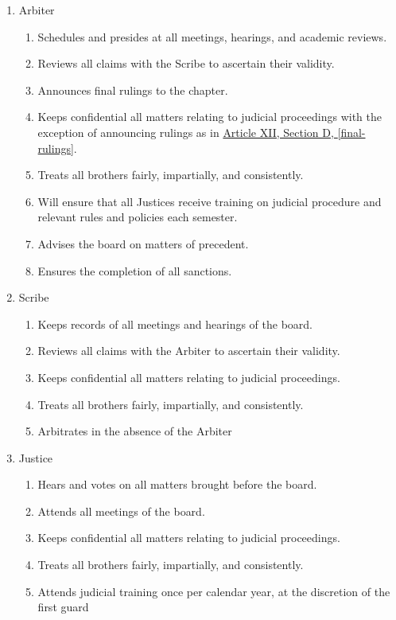 	\begin{enumerate}

		\item Arbiter
			\begin{enumerate}
				\item Schedules and presides at all meetings, hearings, and academic reviews.
				\item Reviews all claims with the Scribe to ascertain their validity.
				\item Announces final rulings to the chapter. \label{final-rulings}
				\item Keeps confidential all matters relating to judicial proceedings with the exception of announcing rulings as in \hyperref[final-rulings]{Article XII, Section D, \autoref*{final-rulings}}.
				\item Treats all brothers fairly, impartially, and consistently.
				\item Will ensure that all Justices receive training on judicial procedure and relevant rules and policies each semester.
				\item Advises the board on matters of precedent.
				\item Ensures the completion of all sanctions.
			\end{enumerate}

		\item Scribe
			\begin{enumerate}
				\item Keeps records of all meetings and hearings of the board.
				\item Reviews all claims with the Arbiter to ascertain their validity.
				\item Keeps confidential all matters relating to judicial proceedings.
				\item Treats all brothers fairly, impartially, and consistently.
				\item Arbitrates in the absence of the Arbiter
			\end{enumerate}

		\item Justice
			\begin{enumerate}
				\item Hears and votes on all matters brought before the board.
				\item Attends all meetings of the board.
				\item Keeps confidential all matters relating to judicial proceedings.
				\item Treats all brothers fairly, impartially, and consistently.
				\item Attends judicial training once per calendar year, at the discretion of the first guard
			\end{enumerate}


\end{enumerate}
